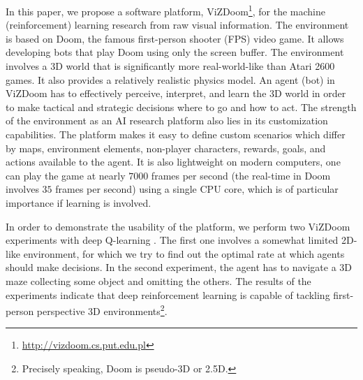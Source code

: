 \documentclass[english,american,conference, balance]{IEEEtran}
\begin{document}
\begin{comment}
Paragraph 3: 

\char`\"{}In this paper, we show that ...\char`\"{}. This is the key
paragraph in the intro - you summarize, in one paragraph, what are
the main contributions of your paper given the context you have established
in paragraphs 1 and 2. What is the general approach taken? Why are
the specific results significant? This paragraph must be really really
good. If you can't \char`\"{}sell\char`\"{} your work at a high level
in a paragraph in the intro, then you are in trouble. As a reader
or reviewer, this is the paragraph that I always look for, and read
very carefully.
\end{comment}

In this paper, we propose a software platform, ViZDoom\footnote{\url{http://vizdoom.cs.put.edu.pl}},
for the machine (reinforcement) learning research from raw visual
information. The environment is based on Doom, the famous first-person
shooter (FPS) video game. It allows developing bots that play Doom
using only the screen buffer. The environment involves a 3D world
that is significantly more real-world-like than Atari 2600 games.
It also provides a relatively realistic physics model. An agent (bot)
in ViZDoom has to effectively perceive, interpret, and learn the 3D
world in order to make tactical and strategic decisions where to go
and how to act. The strength of the environment as an AI research
platform also lies in its customization capabilities. The platform
makes it easy to define custom scenarios which differ by maps, environment
elements, non-player characters, rewards, goals, and actions available
to the agent. It is also lightweight \textendash{} on modern computers,
one can play the game at nearly $7000$ frames per second (the real-time
in Doom involves $35$ frames per second)  using a single CPU core,
which is of particular importance if learning is involved.

In order to demonstrate the usability of the platform, we perform
two ViZDoom experiments with deep Q-learning \cite{mnih-dqn-2015}.
The first one involves a somewhat limited 2D-like environment, for
which we try to find out the optimal rate at which agents should make
decisions. In the second experiment, the agent has to navigate a 3D
maze collecting some object and omitting the others. The results of
the experiments indicate that deep reinforcement learning is capable
of tackling  first-person perspective 3D environments\footnote{Precisely speaking, Doom is pseudo-3D or 2.5D.}.
\end{document}
